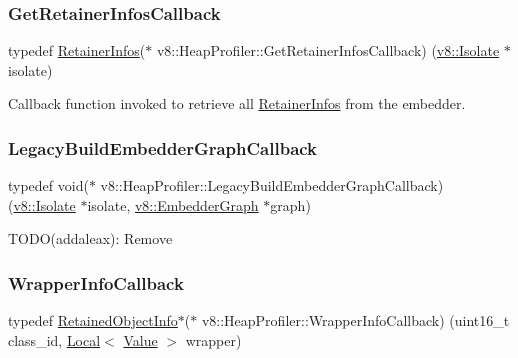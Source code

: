 \subsubsection{\texorpdfstring{Get\+Retainer\+Infos\+Callback}{GetRetainerInfosCallback}}
{\footnotesize\ttfamily typedef \mbox{\hyperlink{structv8_1_1HeapProfiler_1_1RetainerInfos}{Retainer\+Infos}}($\ast$ v8\+::\+Heap\+Profiler\+::\+Get\+Retainer\+Infos\+Callback) (\mbox{\hyperlink{classv8_1_1Isolate}{v8\+::\+Isolate}} $\ast$isolate)}

Callback function invoked to retrieve all \mbox{\hyperlink{structv8_1_1HeapProfiler_1_1RetainerInfos}{Retainer\+Infos}} from the embedder. \mbox{\label{classv8_1_1HeapProfiler_aafaa85413706329f7767f559b701eb1a}} 
\subsubsection{\texorpdfstring{Legacy\+Build\+Embedder\+Graph\+Callback}{LegacyBuildEmbedderGraphCallback}}
{\footnotesize\ttfamily typedef void($\ast$ v8\+::\+Heap\+Profiler\+::\+Legacy\+Build\+Embedder\+Graph\+Callback) (\mbox{\hyperlink{classv8_1_1Isolate}{v8\+::\+Isolate}} $\ast$isolate, \mbox{\hyperlink{classv8_1_1EmbedderGraph}{v8\+::\+Embedder\+Graph}} $\ast$graph)}

T\+O\+D\+O(addaleax)\+: Remove \mbox{\label{classv8_1_1HeapProfiler_a677025dd201fd832e0464e5ab0b0d0d4}} 
\subsubsection{\texorpdfstring{Wrapper\+Info\+Callback}{WrapperInfoCallback}}
{\footnotesize\ttfamily typedef \mbox{\hyperlink{classv8_1_1RetainedObjectInfo}{Retained\+Object\+Info}}$\ast$($\ast$ v8\+::\+Heap\+Profiler\+::\+Wrapper\+Info\+Callback) (uint16\+\_\+t class\+\_\+id, \mbox{\hyperlink{classv8_1_1Local}{Local}}$<$ \mbox{\hyperlink{classv8_1_1Value}{Value}} $>$ wrapper)}

